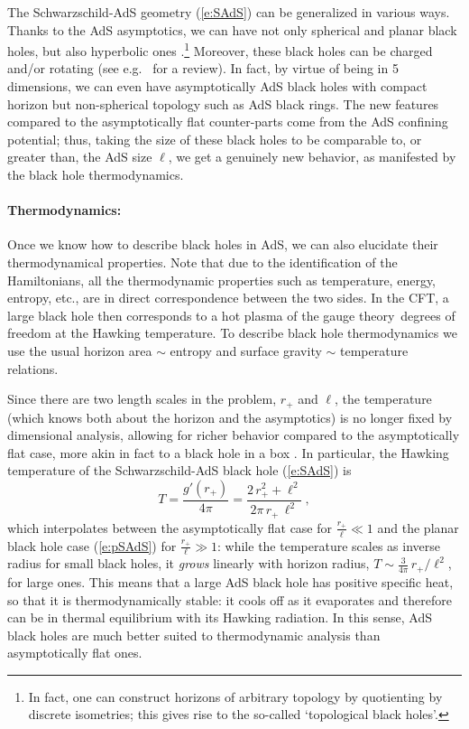 \documentclass[12pt,a4paper]{article}
\def\req#1{(\ref{#1})}
\def\GT{gauge theory}
\def\schw{Schwarzschild}
\def\Rads{\ell}
\def\rh{r_+}
\begin{document}
The \schw-AdS geometry \req{e:SAdS} can be generalized in various ways.
Thanks to the AdS asymptotics, we can have not only spherical and planar black holes, but also hyperbolic ones \cite{Emparan:1999gf}.\footnote{
In fact, one can construct horizons of arbitrary topology by quotienting by discrete isometries; this gives rise to the so-called `topological black holes'.}
Moreover, these black holes can be charged and/or rotating (see e.g.\ \cite{Emparan:2008eg} for a review).  
In fact, by virtue of being in 5 dimensions, we can even have asymptotically AdS black holes with compact horizon but non-spherical topology such as AdS black rings.  The new features compared to the asymptotically flat counter-parts come from the AdS confining potential; thus, taking the size of these black holes to be comparable to, or greater than, the AdS size $\Rads$, we get a genuinely new behavior, as manifested by the black hole thermodynamics.

\paragraph{Thermodynamics:}  %
Once we know how to describe black holes in AdS, we can also elucidate their thermodynamical properties.   Note that due to the identification of the Hamiltonians, all the thermodynamic properties such as temperature, energy, entropy, etc., are in direct correspondence between the two sides.
In the CFT, a large black hole then corresponds to a hot plasma of the \GT\ degrees of freedom at the Hawking temperature. To describe black hole thermodynamics we use the usual horizon area $\sim$ entropy and surface gravity $\sim$ temperature relations.  

Since there are two length scales in the problem, $\rh$ and $\Rads$, 
the temperature (which knows both about the horizon and the asymptotics) is no longer fixed by dimensional analysis,  allowing for richer  behavior compared to the asymptotically flat case,  more akin in fact to a black hole in a box \cite{york1986black}.
In particular, the Hawking temperature of the \schw-AdS black hole \req{e:SAdS} is
%
\begin{equation}
T = \frac{g'(\rh)}{4  \pi}
= \frac{2\, r_+^2 + \Rads^2}{2 \pi\, r_+ \, \Rads^2} \ ,
\label{e:SAdST}
\end{equation}	
%
which interpolates between the asymptotically flat case for $\frac{\rh}{\Rads} \ll 1$ 
and the planar black hole case \req{e:pSAdS} for $\frac{\rh}{\Rads} \gg 1$: while  the temperature scales as inverse radius for small black holes, it {\it grows} linearly with horizon radius, 
$T \sim \frac{3}{4 \pi }\, \rh / \Rads^2$,  for large ones.
This means that a large AdS black hole has positive specific heat, so that it is thermodynamically stable: it cools off as it evaporates and therefore can be in thermal equilibrium with its Hawking radiation.  In this sense, AdS black holes are much better suited to thermodynamic analysis than  asymptotically flat ones.
\end{document}
